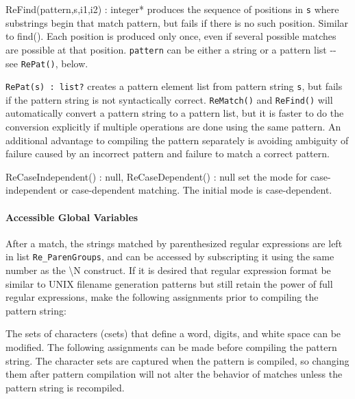 \textsf{ReFind(pattern,s,i1,i2) : integer*} produces the sequence of
positions in \texttt{s} where substrings begin that match
\textsf{pattern}, but fails if there is no such position. Similar to
\textsf{find()}. Each position is produced only once, even if several
possible matches are possible at that position. \texttt{pattern} can be
either a string or a pattern list -{}- see \texttt{RePat()}, below.

\texttt{RePat(s) : list?} creates a pattern element list from pattern
string \texttt{s}, but fails if the pattern string is not syntactically
correct. \texttt{ReMatch()} and \texttt{ReFind()} will automatically
convert a pattern string to a pattern list, but it is faster to do the
conversion explicitly if multiple operations are done using the same
pattern. An additional advantage to compiling the pattern separately is
avoiding ambiguity of failure caused by an incorrect pattern and
failure to match a correct pattern.

\textsf{ReCaseIndependent() : null, ReCaseDependent() : null} set the
mode for case-independent or case-dependent matching. The initial mode
is case-dependent.

\paragraph{Accessible Global Variables}
After a match, the strings matched by parenthesized regular expressions
are left in list \texttt{Re\_ParenGroups}, and can be accessed by
subscripting it using the same number as the {\textbackslash}N
construct. If it is desired that regular expression format be similar
to UNIX filename generation patterns but still retain the power of full
regular expressions, make the following assignments prior to compiling
the pattern string:


The sets of characters (csets) that define a word, digits, and white
space can be modified. The following assignments can be made before
compiling the pattern string. The character sets are captured when the
pattern is compiled, so changing them after pattern compilation will
not alter the behavior of matches unless the pattern string is
recompiled.


